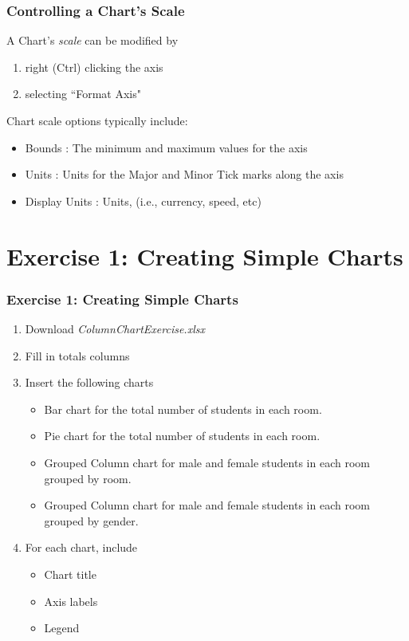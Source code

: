 \documentclass[12pt]{beamer}
\begin{document}
	\begin{frame}
		\frametitle{Controlling a Chart's Scale}
		A Chart's \textit{scale} can be modified by 
		\begin{enumerate} 
			\item right (Ctrl)  clicking the axis
			\item selecting ``Format Axis"
		\end{enumerate}
	Chart scale options typically include:
	\begin{itemize}
		\item Bounds : The minimum and maximum values for the axis
		\item Units : Units for the Major and Minor Tick marks along the axis
		\item Display Units : Units, (i.e., currency, speed, etc)
	\end{itemize}
	
\end{frame}
\section{Exercise 1: Creating Simple Charts}
	\begin{frame}
		\frametitle{Exercise 1: Creating Simple Charts}
		\begin{enumerate}
			\item Download \textit{ColumnChartExercise.xlsx}
			\item Fill in totals columns 
			\item Insert the following charts
			\begin{itemize}
				\item Bar chart for the total number of students in each room.
				\item Pie chart for the total number of students in each room.
				\item Grouped Column chart for male and female students in each room grouped by room.
				\item Grouped Column chart for male and female students in each room grouped by gender. 
				\end{itemize}
			\item For each chart, include
			\begin{itemize}
				\item Chart title
				\item Axis labels
				\item Legend
			\end{itemize}
	\end{enumerate}
\end{frame}
\end{document}
